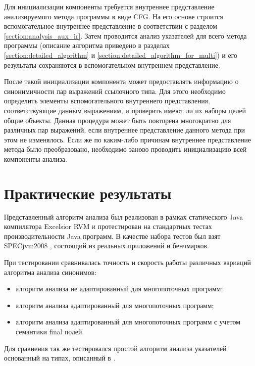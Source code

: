 \documentclass[14pt,titlepage]{extarticle}
\let\oldsection\section
\renewcommand{\section}{\newpage\oldsection}
\begin{document}
      Для инициализации компоненты требуется внутреннее представление
      анализируемого метода программы в виде CFG. На его основе строится
      вспомогательное внутреннее представление в соответствии с разделом
      \ref{section:analysis_aux_ir}. Затем проводится анализ указателей для
      всего метода программы (описание алгоритма приведено в разделах
      \ref{section:detailed_algorithm} и
      \ref{section:detailed_algorithm_for_multi}) и его результаты сохраняются
      в вспомогательном внутреннем представление.

      После такой инициализации компонента может предоставлять информацию о
      синонимичности пар выражений ссылочного типа. Для этого необходимо
      определить элементы вспомогательного внутреннего представления,
      соответствующие данным выражениям, и проверить имеют ли их наборы целей
      общие объекты. Данная процедура может быть повторена многократно для
      различных пар выражений, если внутреннее представление данного метода при
      этом не изменялось. Если же по каким-либо причинам внутреннее
      представление метода было преобразовано, необходимо заново проводить
      инициализацию всей компоненты анализа.

  \section{Практические результаты}

    Представленный алгоритм анализа был реализован в рамках статического
    Java компилятора Excelsior RVM и протестирован на стандартных тестах
    производительности Java программ.
    В качестве набора тестов был взят SPECjvm2008 \cite{spec_jvm}, состоящий из
    реальных приложений и бенчмарков.

    При тестировании сравнивалась точность и скорость работы различных вариаций
    алгоритма анализа синонимов:
    \begin{itemize}
      \item алгоритм анализа не адаптированный для многопоточных программ;
      \item алгоритм анализа адаптированный для многопоточных программ;
      \item алгоритм анализа адаптированный для многопоточных программ с
            учетом семантики final полей.
    \end{itemize}
    Для сравнения так же тестировался простой алгоритм анализа указателей
    основанный на типах, описанный в \cite{diwan_tbaa}.
\end{document}
